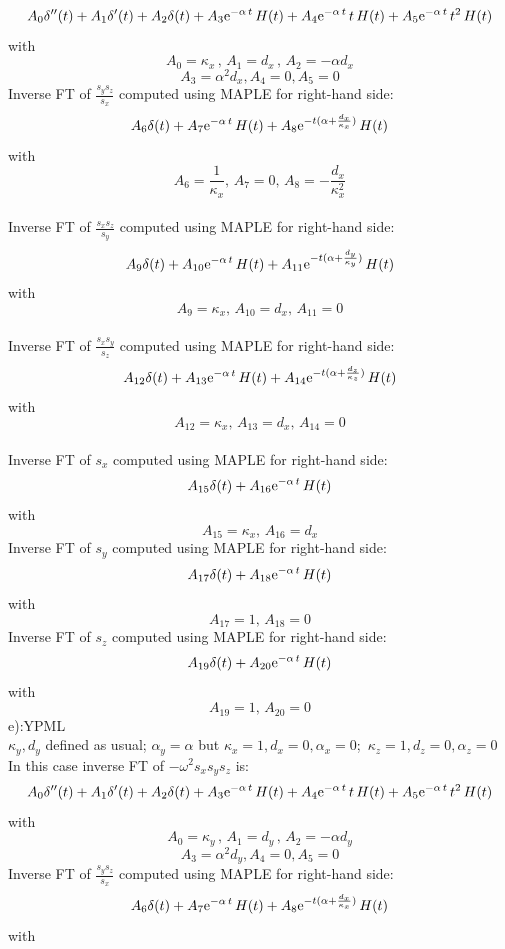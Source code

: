 \documentclass[onecolumn,extra]{gji_modified_cours_UPPA}
\begin{document}
$$A_0 \delta''(t) + A_1 \delta'(t) + A_2 \delta(t)
+ A_3 {\rm e}^{-\alpha\,t} \, H(t)
+ A_4 {\rm e}^{-\alpha\,t} \,t\, H(t)
+ A_5 {\rm e}^{-\alpha\,t} \,t^{2} \,H(t)$$
with
$$A_0 = \kappa_x \, , \, A_1 =d_x\, , \,A_2 = -\alpha d_x $$
$$A_3= \alpha ^2 d_x , A_4= 0, A_5=0 $$
\noindent
Inverse FT of $\frac{s_y s_z}{s_x}$ computed using MAPLE for right-hand side:\\
$$A_6\delta(t) + A_7 {\rm e}^{-\alpha\,t} \, H(t) + A_8 {\rm e}^{-t(\alpha+\frac{d_x}{\kappa_x})} \, H(t) $$
with
$$A_6=\frac{1}{\kappa_x},\,A_7=0,\,A_8=-\frac{d_x}{\kappa^2_x} $$\\
\noindent
Inverse FT of $\frac{s_x s_z}{s_y}$ computed using MAPLE for right-hand side:\\
$$A_9\delta(t) + A_{10} {\rm e}^{-\alpha\,t} \, H(t) + A_{11} {\rm e}^{-t(\alpha+\frac{d_y}{\kappa_y})} \, H(t) $$
with
$$A_9=\kappa_x,\,A_{10}=d_x,
\,A_{11}= 0 $$\\
\noindent
Inverse FT of $\frac{s_x s_y}{s_z}$ computed using MAPLE for right-hand side:\\
$$ A_{12}\delta(t) + A_{13} {\rm e}^{-\alpha\,t} \, H(t) + A_{14} {\rm e}^{-t(\alpha+\frac{d_z}{\kappa_z})} \, H(t) $$
with
$$A_{12}=\kappa_x ,\,A_{13}=d_x,
\,A_{14}=0$$\\
\noindent
Inverse FT of $s_x$ computed using MAPLE for right-hand side:
$$A_{15}\delta(t) + A_{16} {\rm e}^{-\alpha \,t} \, H(t) $$
with
$$A_{15}= \kappa_x, \, A_{16}=d_x $$
\noindent
Inverse FT of $s_y$ computed using MAPLE for right-hand side:
$$A_{17}\delta(t) + A_{18} {\rm e}^{-\alpha \,t} \, H(t) $$
with
$$A_{17}= 1, \, A_{18}=0 $$
\noindent
Inverse FT of $s_z$ computed using MAPLE for right-hand side:
$$A_{19}\delta(t) + A_{20} {\rm e}^{-\alpha \,t} \, H(t) $$
with
$$A_{19}= 1, \, A_{20}=0 $$
e):YPML\\
$\kappa_y,d_y$ defined as usual; $\alpha_y=\alpha$ but $\kappa_x = 1 ,d_x= 0,\alpha_x= 0$;$\,$ $\kappa_z = 1 ,d_z= 0,\alpha_z= 0$\\
In this case inverse FT of $-\omega^2 s_x s_y s_z$ is:
$$A_0 \delta''(t) + A_1 \delta'(t) + A_2 \delta(t)
+ A_3 {\rm e}^{-\alpha\,t} \, H(t)
+ A_4 {\rm e}^{-\alpha\,t} \,t\, H(t)
+ A_5 {\rm e}^{-\alpha\,t} \,t^{2} \,H(t)$$
with
$$A_0 = \kappa_y \, , \, A_1 =d_y\, , \,A_2 = -\alpha d_y $$
$$A_3= \alpha ^2 d_y , A_4= 0, A_5=0 $$
\noindent
Inverse FT of $\frac{s_y s_z}{s_x}$ computed using MAPLE for right-hand side:\\
$$A_6\delta(t) + A_7 {\rm e}^{-\alpha\,t} \, H(t) + A_8 {\rm e}^{-t(\alpha+\frac{d_x}{\kappa_x})} \, H(t) $$
with
\end{document}
